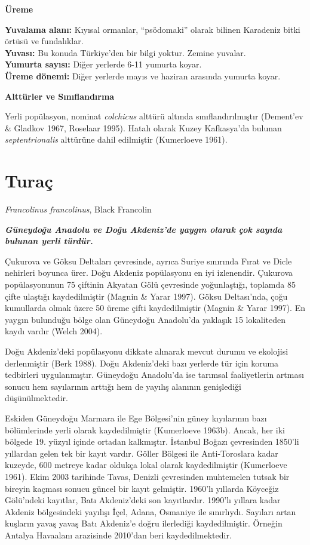 \documentclass[
  letterpaper,
  DIV=11,
  numbers=noendperiod]{scrreprt}
\begin{document}
\textbf{Üreme}

\textbf{Yuvalama alanı:} Kıyısal ormanlar, ``psödomaki'' olarak bilinen
Karadeniz bitki örtüsü ve fundalıklar.\\
\textbf{Yuvası:} Bu konuda Türkiye'den bir bilgi yoktur. Zemine
yuvalar.\\
\textbf{Yumurta sayısı:} Diğer yerlerde 6-11 yumurta koyar.\\
\textbf{Üreme dönemi:} Diğer yerlerde mayıs ve haziran arasında yumurta
koyar.

\textbf{Alttürler ve Sınıflandırma}

Yerli popülasyon, nominat \emph{colchicus} alttürü altında
sınıflandırılmıştır (Dement'ev \& Gladkov 1967, Roselaar 1995). Hatalı
olarak Kuzey Kafkasya'da bulunan \emph{septentrionalis} alttürüne dahil
edilmiştir (Kumerloeve 1961).

\section{Turaç}\label{turauxe7}

\emph{Francolinus francolinus}, Black Francolin

\textbf{\emph{Güneydoğu Anadolu ve Doğu Akdeniz'de yaygın olarak çok
sayıda bulunan yerli türdür.}}

Çukurova ve Göksu Deltaları çevresinde, ayrıca Suriye sınırında Fırat ve
Dicle nehirleri boyunca ürer. Doğu Akdeniz popülasyonu en iyi
izlenendir. Çukurova popülasyonunun 75 çiftinin Akyatan Gölü çevresinde
yoğunlaştığı, toplamda 85 çifte ulaştığı kaydedilmiştir (Magnin \& Yarar
1997). Göksu Deltası'nda, çoğu kumullarda olmak üzere 50 üreme çifti
kaydedilmiştir (Magnin \& Yarar 1997). En yaygın bulunduğu bölge olan
Güneydoğu Anadolu'da yaklaşık 15 lokaliteden kaydı vardır (Welch 2004).

Doğu Akdeniz'deki popülasyonu dikkate alınarak mevcut durumu ve
ekolojisi derlenmiştir (Berk 1988). Doğu Akdeniz'deki bazı yerlerde tür
için koruma tedbirleri uygulanmıştır. Güneydoğu Anadolu'da ise tarımsal
faaliyetlerin artması sonucu hem sayılarının arttığı hem de yayılış
alanının genişlediği düşünülmektedir.

Eskiden Güneydoğu Marmara ile Ege Bölgesi'nin güney kıyılarının bazı
bölümlerinde yerli olarak kaydedilmiştir (Kumerloeve 1963b). Ancak, her
iki bölgede 19. yüzyıl içinde ortadan kalkmıştır. İstanbul Boğazı
çevresinden 1850'li yıllardan gelen tek bir kayıt vardır. Göller Bölgesi
ile Anti-Toroslara kadar kuzeyde, 600 metreye kadar oldukça lokal olarak
kaydedilmiştir (Kumerloeve 1961). Ekim 2003 tarihinde Tavas, Denizli
çevresinden muhtemelen tutsak bir bireyin kaçması sonucu güncel bir
kayıt gelmiştir. 1960'lı yıllarda Köyceğiz Gölü'ndeki kayıtlar, Batı
Akdeniz'deki son kayıtlardır. 1990'lı yıllara kadar Akdeniz bölgesindeki
yayılışı İçel, Adana, Osmaniye ile sınırlıydı. Sayıları artan kuşların
yavaş yavaş Batı Akdeniz'e doğru ilerlediği kaydedilmiştir. Örneğin
Antalya Havaalanı arazisinde 2010'dan beri kaydedilmektedir.
\end{document}
